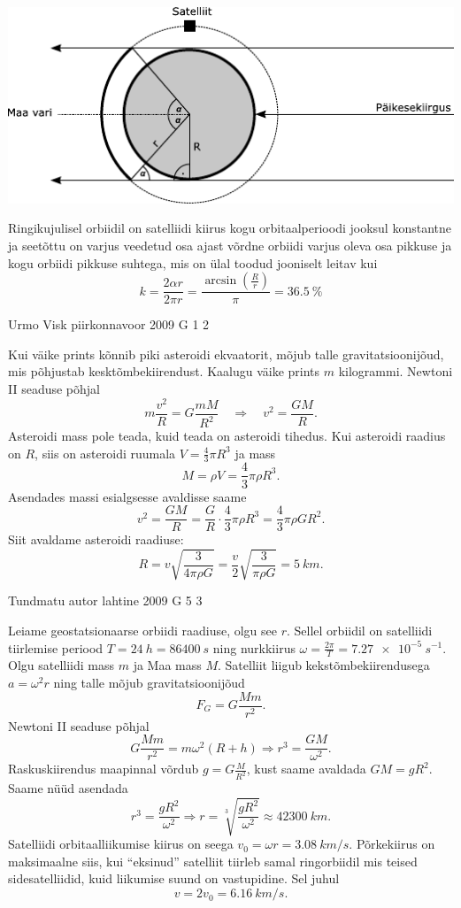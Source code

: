 \documentclass[11pt, twoside]{article}
\begin{document}
{{\ifSolution
\begin{center}
	\includegraphics[width=0.9\linewidth]{2011-v2g-02-lah}
\end{center}
Ringikujulisel orbiidil on satelliidi kiirus kogu orbitaalperioodi jooksul konstantne ja seetõttu on varjus veedetud osa ajast võrdne orbiidi varjus oleva osa pikkuse ja kogu orbiidi pikkuse suhtega, mis on ülal toodud jooniselt leitav kui 
\[
k=\frac{2 \alpha r}{2 \pi r}=\frac{\arcsin \left(\frac{R}{r}\right)}{\pi}=\SI{36,5}{\%}
\]
\fi
}

{Urmo Visk} %
{piirkonnavoor} %
{2009} %
{G 1} %
{2} %
{

\ifSolution
Kui väike prints kõnnib piki asteroidi ekvaatorit, mõjub talle gravitatsioonijõud,
mis põhjustab kesktõmbekiirendust. Kaalugu väike prints $m$ kilogrammi. Newtoni
II seaduse põhjal
\[
m \frac{v^{2}}{R}=G \frac{m M}{R^{2}} \quad \Rightarrow \quad v^{2}=\frac{G M}{R}.
\]
Asteroidi mass pole teada, kuid teada on asteroidi tihedus. Kui asteroidi raadius on $R$, siis on asteroidi ruumala $V=\frac{4}{3} \pi R^{3}$ ja mass
\[
M=\rho V=\frac{4}{3} \pi \rho R^{3}.
\]
Asendades massi esialgsesse avaldisse saame
\[
v^{2}=\frac{G M}{R}=\frac{G}{R} \cdot \frac{4}{3} \pi \rho R^{3}=\frac{4}{3} \pi \rho G R^{2}.
\]
Siit avaldame asteroidi raadiuse:
\[
R=v \sqrt{\frac{3}{4 \pi \rho G}}=\frac{v}{2} \sqrt{\frac{3}{\pi \rho G}}=\SI{5}{km}.
\]
\fi
}

{Tundmatu autor} %
{lahtine} %
{2009} %
{G 5} %
{3} %
{

\ifSolution
Leiame geostatsionaarse orbiidi raadiuse, olgu see $r$. Sellel orbiidil on satelliidi tiirlemise periood $T = \SI{24}{h} = \SI{86400}{s}$ ning nurkkiirus $\omega=\frac{2 \pi}{T}=\SI{7,27e-5}{s^{-1}}$. Olgu satelliidi mass $m$ ja Maa mass $M$. Satelliit liigub kekstõmbekiirendusega $a = \omega^2 r$ ning talle mõjub gravitatsioonijõud
\[
F_{G}=G \frac{M m}{r^{2}}.
\]
Newtoni II seaduse põhjal
\[
G \frac{M m}{r^{2}}=m \omega^{2}(R+h) \Rightarrow r^{3}=\frac{G M}{\omega^{2}}.
\]
Raskuskiirendus maapinnal võrdub $g=G \frac{M}{R^{2}}$, kust saame avaldada $GM = gR^2$.
Saame nüüd asendada 
\[
r^{3}=\frac{g R^{2}}{\omega^{2}} \Rightarrow r=\sqrt[3]{\frac{g R^{2}}{\omega^{2}}} \approx \SI{42300}{km}.
\]
Satelliidi orbitaalliikumise kiirus on seega $v_0 = \omega r = \SI{3,08}{km/s}$. Põrkekiirus on maksimaalne siis, kui \enquote{eksinud} satelliit tiirleb samal ringorbiidil mis teised sidesatelliidid, kuid liikumise suund on vastupidine. Sel juhul
\[
v=2 v_{0}=\SI{6,16}{km/s}.
\]
\fi
}

}
\end{document}
